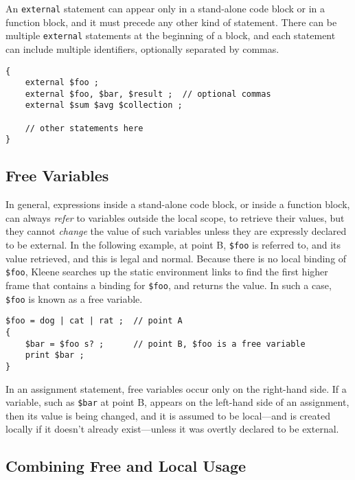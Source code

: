 An \texttt{external} statement can appear only in a stand-alone code block or in a
function block, and it must precede any other kind of statement.  There can be multiple
\texttt{external} statements at the beginning of a block, 
and each statement can include multiple
identifiers, optionally separated by commas.

\begin{samepage}
\begin{Verbatim}
{
    external $foo ;
    external $foo, $bar, $result ;  // optional commas
    external $sum $avg $collection ;

    // other statements here
}
\end{Verbatim}
\end{samepage}


\subsection{Free Variables}

In general, expressions inside a stand-alone code block, or inside a function block, can
always \emph{refer} to variables outside the local scope, to retrieve their values, but
they cannot \emph{change} the value of such variables unless they are expressly declared to be
external. In the following example, at point B, \verb!$foo! is referred to, and its
value retrieved, and this is legal and normal.  Because there is no local binding of
\verb!$foo!, Kleene searches up the static environment links to find the first higher
frame that contains a binding for \verb!$foo!,  and returns the value.  In such a case,
\verb!$foo! is known as a free variable.

\begin{samepage}
\begin{Verbatim}
$foo = dog | cat | rat ;  // point A
{
    $bar = $foo s? ;      // point B, $foo is a free variable
    print $bar ;
}
\end{Verbatim}
\end{samepage}

\noindent 
In an assignment statement, free variables occur only on the right-hand side.
If a variable, such as \verb!$bar! at point B, 
appears on the left-hand side of an assignment, then its value is being
changed, and it is assumed to be local---and is created locally if it doesn't already
exist---unless it was overtly declared to be external.

\subsection{Combining Free and Local Usage}

